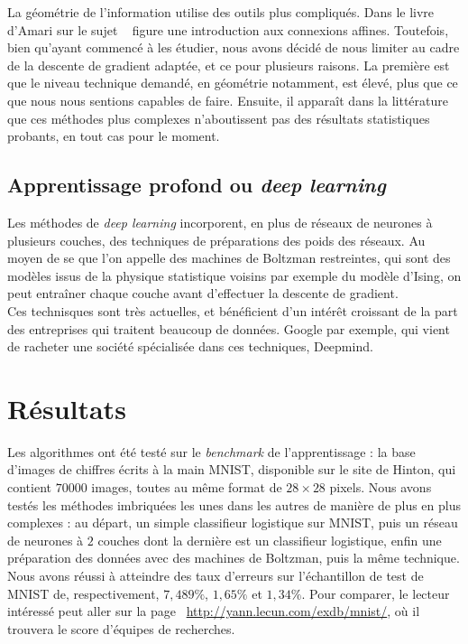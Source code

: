 \documentclass{article}
\begin{document}
La géométrie de l'information utilise des outils plus compliqués. Dans le livre d'Amari sur le sujet ~\cite{Amari} figure une introduction aux connexions affines. Toutefois, bien qu'ayant commencé à les étudier, nous avons décidé de nous limiter au cadre de la descente de gradient adaptée, et ce pour plusieurs raisons. La première est que le niveau technique demandé, en géométrie notamment, est élevé, plus que ce que nous nous sentions capables de faire. Ensuite, il apparaît dans la littérature que ces méthodes plus complexes n'aboutissent pas des résultats statistiques probants, en tout cas pour le moment. \\

\subsection{Apprentissage profond ou \textit{deep learning}}

Les méthodes de \textit{deep learning} incorporent, en plus de réseaux de neurones à plusieurs couches, des techniques de préparations des poids des réseaux. Au moyen de se que l'on appelle des machines de Boltzman restreintes, qui sont des modèles issus de la physique statistique voisins par exemple du modèle d'Ising, on peut entraîner chaque couche avant d'effectuer la descente de gradient.\\

Ces technisques sont très actuelles, et bénéficient d'un intérêt croissant de la part des entreprises qui traitent beaucoup de données. Google par exemple, qui vient de racheter une société spécialisée dans ces techniques, Deepmind.\\

\section{Résultats}

Les algorithmes ont été testé sur le \textit{benchmark} de l'apprentissage : la base d'images de chiffres écrits à la main MNIST, disponible sur le site de Hinton, qui contient $70 000$ images, toutes au même format de $28\times 28$ pixels. Nous avons testés les méthodes imbriquées les unes dans les autres de manière de plus en plus complexes : au départ, un simple classifieur logistique sur MNIST, puis un réseau de neurones à $2$ couches dont la dernière est un classifieur logistique, enfin une préparation des données avec des machines de Boltzman, puis la même technique. Nous avons réussi à atteindre des taux d'erreurs sur l'échantillon de test de MNIST de, respectivement, $7,489\%$, $1,65\%$ et $1,34\%$. Pour comparer, le lecteur intéressé peut aller sur la page ~\url{http://yann.lecun.com/exdb/mnist/}, où il trouvera le score d'équipes de recherches. \\
\end{document}
